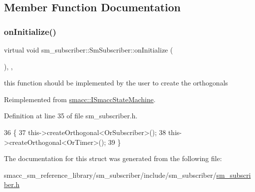 \subsection{Member Function Documentation}
\mbox{\label{structsm__subscriber_1_1SmSubscriber_ae32eb6aee71a536eff03a5fdb8c8554a}} 
\subsubsection{\texorpdfstring{on\+Initialize()}{onInitialize()}}
{\footnotesize\ttfamily virtual void sm\+\_\+subscriber\+::\+Sm\+Subscriber\+::on\+Initialize (\begin{DoxyParamCaption}{ }\end{DoxyParamCaption})\hspace{0.3cm}{\ttfamily [inline]}, {\ttfamily [override]}, {\ttfamily [virtual]}}



this function should be implemented by the user to create the orthogonals 



Reimplemented from \hyperlink{classsmacc_1_1ISmaccStateMachine_ac2982c6c8283663e5e1e8a7c82f511ec}{smacc\+::\+I\+Smacc\+State\+Machine}.



Definition at line 35 of file sm\+\_\+subscriber.\+h.


\begin{DoxyCode}
36   \{
37     this->createOrthogonal<OrSubscriber>();
38     this->createOrthogonal<OrTimer>();
39   \}
\end{DoxyCode}


The documentation for this struct was generated from the following file\+:\begin{DoxyCompactItemize}
\item 
smacc\+\_\+sm\+\_\+reference\+\_\+library/sm\+\_\+subscriber/include/sm\+\_\+subscriber/\hyperlink{sm__subscriber_8h}{sm\+\_\+subscriber.\+h}\end{DoxyCompactItemize}

